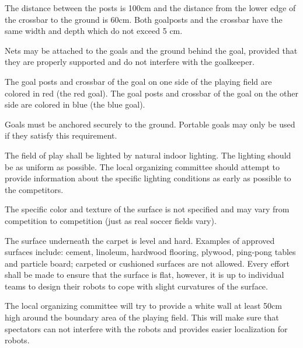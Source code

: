 \documentclass[12pt]{hurocup}
\begin{document}
\begin{lawlist}
\item The distance between the posts is 100cm and the distance from
  the lower edge of the crossbar to the ground is 60cm. Both goalposts
  and the crossbar have the same width and depth which do not exceed 5
  cm.
  
\item Nets may be attached to the goals and the ground behind the
  goal, provided that they are properly supported and do not interfere
  with the goalkeeper.
  
\item The goal posts and crossbar of the goal on one side of the
  playing field are colored in red (the red goal).
  The goal posts and crossbar of the goal on the other side are
  colored in blue (the blue goal).
  
\item Goals must be anchored securely to the ground. Portable goals
  may only be used if they satisfy this requirement.

\end{lawlist}

\begin{decisions}

\item The field of play shall be lighted by natural indoor
  lighting. The lighting should be as uniform as possible. The local
  organizing committee should attempt to provide information about the
  specific lighting conditions as early as possible to the
  competitors.
  
\item The specific color and texture of the surface is not specified
  and may vary from competition to competition (just as real soccer
  fields vary). 

\item The surface underneath the carpet is level and
  hard. Examples of approved surfaces include: cement, linoleum,
  hardwood flooring, plywood, ping-pong tables and particle board;
  carpeted or cushioned surfaces are not allowed. Every effort shall
  be made to ensure that the surface is flat, however, it is up to
  individual teams to design their robots to cope with slight
  curvatures of the surface.

\item The local organizing committee will try to provide a white wall at
least 50cm high around the boundary area of the playing field. This
will make sure that spectators can not interfere with the robots and
provides easier localization for robots.

\end{decisions}
\end{document}
